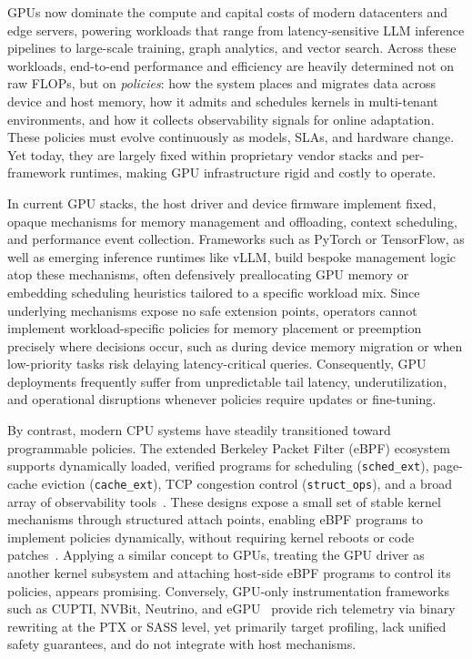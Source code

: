 GPUs now dominate the compute and capital costs of modern datacenters and edge servers, powering workloads that range from latency-sensitive LLM inference pipelines to large-scale training, graph analytics, and vector search. Across these workloads, end-to-end performance and efficiency are heavily determined not on raw FLOPs, but on \emph{policies}: how the system places and migrates data across device and host memory, how it admits and schedules kernels in multi-tenant environments, and how it collects observability signals for online adaptation. These policies must evolve continuously as models, SLAs, and hardware change. Yet today, they are largely fixed within proprietary vendor stacks and per-framework runtimes, making GPU infrastructure rigid and costly to operate.

In current GPU stacks, the host driver and device firmware implement fixed, opaque mechanisms for memory management and offloading, context scheduling, and performance event collection. Frameworks such as PyTorch or TensorFlow, as well as emerging inference runtimes like vLLM, build bespoke management logic atop these mechanisms, often defensively preallocating GPU memory or embedding scheduling heuristics tailored to a specific workload mix. Since underlying mechanisms expose no safe extension points, operators cannot implement workload-specific policies for memory placement or preemption precisely where decisions occur, such as during device memory migration or when low-priority tasks risk delaying latency-critical queries. Consequently, GPU deployments frequently suffer from unpredictable tail latency, underutilization, and operational disruptions whenever policies require updates or fine-tuning.

By contrast, modern CPU systems have steadily transitioned toward programmable policies. The extended Berkeley Packet Filter (eBPF) ecosystem supports dynamically loaded, verified programs for scheduling (\texttt{sched\_ext}), page-cache eviction (\texttt{cache\_ext}), TCP congestion control (\texttt{struct\_ops}), and a broad array of observability tools~\cite{gregg16,gregg2021computing,Bachl21,Zhong22,jia2023programmable}. These designs expose a small set of stable kernel mechanisms through structured attach points, enabling eBPF programs to implement policies dynamically, without requiring kernel reboots or code patches~\cite{schedext-docs,cacheext-docs}. Applying a similar concept to GPUs, treating the GPU driver as another kernel subsystem and attaching host-side eBPF programs to control its policies, appears promising. Conversely, GPU-only instrumentation frameworks such as CUPTI, NVBit, Neutrino, and eGPU~\cite{cupti,villa2019nvbit,neutrino,eGPU} provide rich telemetry via binary rewriting at the PTX or SASS level, yet primarily target profiling, lack unified safety guarantees, and do not integrate with host mechanisms.

